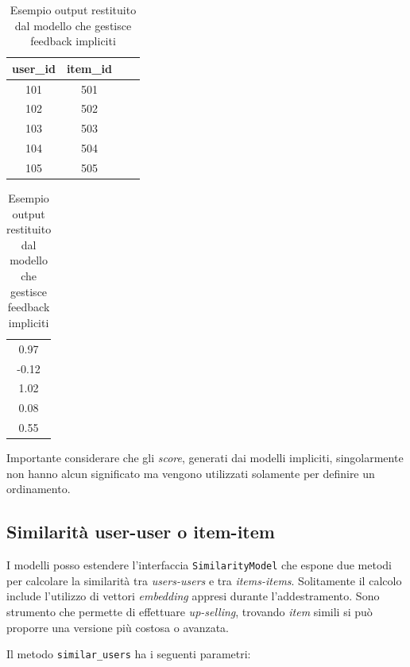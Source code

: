 \begin{table}[H]
    \centering
    \begin{minipage}{0.6\textwidth}
        \centering
        \begin{tabular}{|c|c|c|c|}
        \hline
        \textbf{user\_id} & \textbf{item\_id} \\
        \hline
            101 & 501 \\
            102 & 502 \\
            103 & 503 \\
            104 & 504 \\
            105 & 505 \\
        \hline
        \end{tabular}
    \end{minipage}%
    \hfill
    \begin{minipage}{0.3\textwidth}
        \centering
        \begin{tabular}{|c|}
        \hline
        0.97 \\
        -0.12 \\
        1.02 \\
        0.08 \\
        0.55 \\
        \hline
        \end{tabular}
    \end{minipage}
    \caption{Esempio output restituito dal modello che gestisce feedback impliciti}
    \label{tab:ratings_with_score}
\end{table}

Importante considerare che gli \textit{score}, generati dai modelli impliciti, singolarmente non hanno alcun significato ma vengono utilizzati solamente per definire un ordinamento.

\subsection{Similarità user-user o item-item}

I modelli posso estendere l'interfaccia \texttt{SimilarityModel} che espone due metodi per calcolare la similarità tra \textit{users-users} e tra \textit{items-items}. Solitamente il calcolo include l'utilizzo di vettori \textit{embedding} appresi durante l'addestramento. Sono strumento che permette di effettuare \textit{up-selling}, trovando \textit{item} simili si può proporre una versione più costosa o avanzata.

Il metodo \texttt{similar\_users} ha i seguenti parametri:

